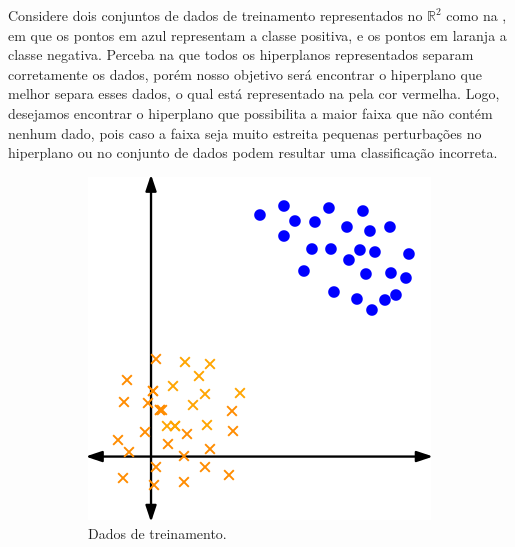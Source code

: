 \documentclass[12pt,a4paper]{scrartcl}
\def\RR{\mathds{R}}
\theoremstyle{definition}%
\begin{document}
Considere dois conjuntos de dados de treinamento representados no $\RR^2$ como na , em que os pontos em azul representam a classe positiva, e os pontos em laranja a classe negativa. Perceba na  que todos os hiperplanos representados separam corretamente os dados, porém nosso objetivo será encontrar o hiperplano que melhor separa esses dados, o qual está representado na  pela cor vermelha. Logo, desejamos encontrar o hiperplano que possibilita a maior faixa que não contém nenhum dado, pois caso a faixa seja muito estreita pequenas perturbações no hiperplano ou no conjunto de dados podem resultar uma classificação incorreta. 
\begin{figure}[htbp] 
	\centering
	\begin{subfigure}[h]{0.38\textwidth}
		\centering
		\includegraphics[width=\textwidth]{dados_treinamento}
		\caption{Dados de treinamento. \label{fig:dados_e_hiperplanos:dados_treinamento}}
	\end{subfigure}
	\begin{subfigure}[h]{0.38\textwidth}
		\centering

\end{subfigure}
\end{figure}
\end{document}
